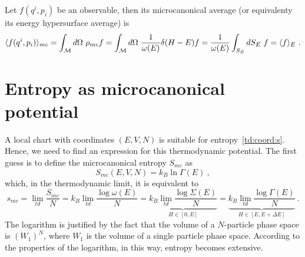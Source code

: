     Let $f(q^i, p_i)$ be an observable, then its microcanonical average (or equivalenty its energy hypersurface average) is 
    \begin{equation}\label{mc:av}
        \langle f(q^i, p_i)\rangle_{mc} = \int_{\mathcal M} d\Omega ~ \rho_{mc} f = \int_{\mathcal M} d\Omega ~ \frac{1}{\omega(E)} \delta (H - E) f = \frac{1}{\omega(E)} \int_{S_E} dS_E ~ f = \langle f\rangle_{E} ~.
    \end{equation}

\section{Entropy as microcanonical potential}

    A local chart with coordinates $(E, V, N)$ is suitable for entropy~\eqref{td:coord:s}. Hence, we need to find an expression for this thermodynamic potential. The first guess is to define the microcanonical entropy $S_{mc}$ as 
    \begin{equation}\label{mc:s}
        S_{mc} (E, V, N) = k_B \ln \Gamma(E) ~,
    \end{equation}
    which, in the thermodynamic limit, it is equivalent to
    \begin{equation}\label{mc:tdlim}
        s_{mc} = \lim_{td} \frac{S_{mc}}{N} = k_B \lim_{td} \frac{\log \omega(E)}{N} = \underbrace{k_B \lim_{td} \frac{\log \Sigma(E)}{N}}_{H \in [0, E]} = \underbrace{k_B \lim_{td} \frac{\log \Gamma(E)}{N}}_{H \in [E, E + \Delta E]} ~.
    \end{equation}
    The logarithm is justified by the fact that the volume of a $N$-particle phase space is $(W_1)^N$, where $W_1$ is the volume of a single particle phase space. According to the properties of the logarithm, in this way, entropy becomes extensive.

